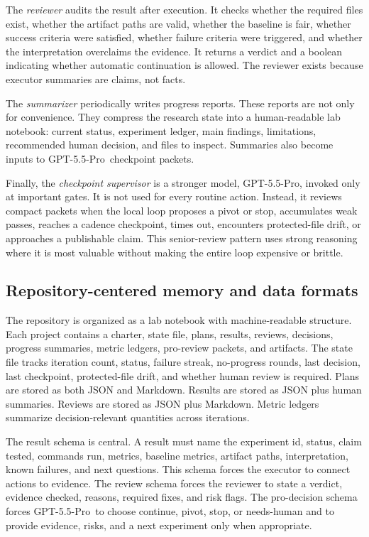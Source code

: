 \documentclass{article}
\newcommand{\gptpro}{GPT-5.5-Pro}
\begin{document}
The \emph{reviewer} audits the result after execution. It checks whether the required files exist, whether the artifact paths are valid, whether the baseline is fair, whether success criteria were satisfied, whether failure criteria were triggered, and whether the interpretation overclaims the evidence. It returns a verdict and a boolean indicating whether automatic continuation is allowed. The reviewer exists because executor summaries are claims, not facts.

The \emph{summarizer} periodically writes progress reports. These reports are not only for convenience. They compress the research state into a human-readable lab notebook: current status, experiment ledger, main findings, limitations, recommended human decision, and files to inspect. Summaries also become inputs to \gptpro\ checkpoint packets.

Finally, the \emph{checkpoint supervisor} is a stronger model, \gptpro, invoked only at important gates. It is not used for every routine action. Instead, it reviews compact packets when the local loop proposes a pivot or stop, accumulates weak passes, reaches a cadence checkpoint, times out, encounters protected-file drift, or approaches a publishable claim. This senior-review pattern uses strong reasoning where it is most valuable without making the entire loop expensive or brittle.

\subsection{Repository-centered memory and data formats}

The repository is organized as a lab notebook with machine-readable structure. Each project contains a charter, state file, plans, results, reviews, decisions, progress summaries, metric ledgers, pro-review packets, and artifacts. The state file tracks iteration count, status, failure streak, no-progress rounds, last decision, last checkpoint, protected-file drift, and whether human review is required. Plans are stored as both JSON and Markdown. Results are stored as JSON plus human summaries. Reviews are stored as JSON plus Markdown. Metric ledgers summarize decision-relevant quantities across iterations.

The result schema is central. A result must name the experiment id, status, claim tested, commands run, metrics, baseline metrics, artifact paths, interpretation, known failures, and next questions. This schema forces the executor to connect actions to evidence. The review schema forces the reviewer to state a verdict, evidence checked, reasons, required fixes, and risk flags. The pro-decision schema forces \gptpro\ to choose continue, pivot, stop, or needs-human and to provide evidence, risks, and a next experiment only when appropriate.
\end{document}
